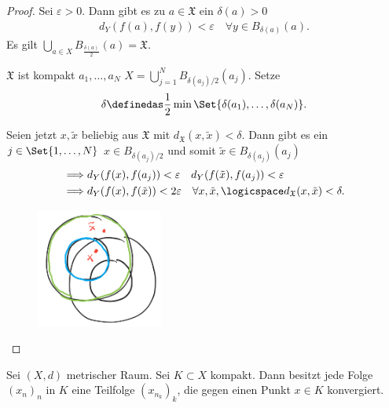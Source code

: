 \begin{proof}
    Sei \( \varepsilon>0 \). Dann gibt es zu \( a\in \mathfrak{X} \) ein \( \delta(a)>0 \) \sd
    \begin{align*}
        d_Y(f(a),f(y))<\varepsilon\quad \forall y\in B_{\delta(a)}(a).
    \end{align*}
    Es gilt \( \bigcup_{a\in X} B_{\frac{\delta(a)}{2}}(a)=\mathfrak{X}\).

    \( \mathfrak{X} \) ist kompakt \timplies \texists \( a_1,\ldots,a_N \) \sd \( X=\bigcup\limits_{j=1}^{N}B_{\delta(a_j)/2} (a_j)\). Setze 
    \begin{align*}
        \delta\definedas \frac{1}{2}\min\Set{\delta(a_1),\ldots,\delta(a_N)}.
    \end{align*}

    Seien jetzt \( x,\tilde{x} \) beliebig aus \( \mathfrak{X} \) mit \( d_{\mathfrak{X}}(x,\tilde{x})<\delta \). Dann gibt es ein \( j\in \Set{1,\ldots, N} \) \sd \( x\in B_{\delta(a_j)/2} \) und somit \( \tilde{x}\in B_{\delta(a_j)}(a_j) \)
    \begin{align*}
        \implies &d_Y(f(x),f(a_j))<\varepsilon \quad d_Y(f(\tilde{x}),f(a_j))<\varepsilon\\
        \implies &d_Y(f(x),f(\tilde{x}))<2\varepsilon \quad \forall x,\tilde{x},\logicspace d_{\mathfrak{X}}(x,\tilde{x})<\delta.
    \end{align*}
    \begin{figure}[H]
        \centering
        \includegraphics[width=0.4\linewidth]{figures/doppel_doppel_ball}
        \label{fig:doppel_doppel_ball}
    \end{figure}
    
\end{proof}
\begin{satz}\label{bolzanoweierstrass}
    Sei \( (X,d) \) metrischer Raum. Sei \( K\subset X \) kompakt. Dann besitzt jede Folge \( (x_n)_n \) in \( K \) eine Teilfolge \( (x_{n_k})_k \), die gegen einen Punkt \( x\in K \) konvergiert. 
\end{satz}
